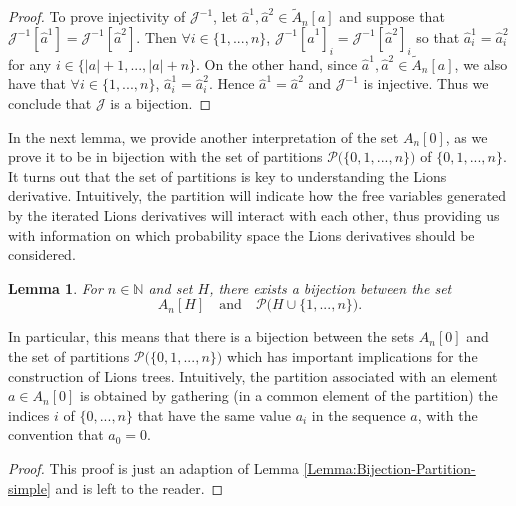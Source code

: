 \documentclass[a4paper,11pt,twoside]{article}
\numberwithin{equation}{section}
\theoremstyle{plain}
\newtheorem{lemma}[theorem]{Lemma}
\newcommand{\bN}{\mathbb{N}}
\newcommand{\cJ}{\mathcal{J}}
\newcommand{\scP}{\mathscr{P}}
\newcommand{\A}[1]{A_{#1}[0]}
\newcommand{\1}{\mathbbm{1}}
\begin{document}
\begin{proof}
		To prove injectivity of $\cJ^{-1}$, let $\hat{a}^1, \hat{a}^2 \in \tilde{A}_n[a]$ and suppose that $\cJ^{-1}[\hat{a}^1] = \cJ^{-1}[\hat{a}^2]$. Then $\forall i \in \{1, ..., n\}$, $\cJ^{-1}[\hat{a}^1]_i = \cJ^{-1}[\hat{a}^2]_i$ so that $\hat{a}_i^1 = \hat{a}_i^2$ for any $i\in \{|a|+1, ..., |a| + n\}$. On the other hand, since $\hat{a}^1, \hat{a}^2\in \tilde{A}_n[a]$, we also have that $\forall i\in \{1, ..., n\}$, $\hat{a}_i^1 = \hat{a}_i^2$. Hence $\hat{a}^1 = \hat{a}^2$ and $\cJ^{-1}$ is injective. Thus we conclude that $\cJ$ is a bijection. 
	\end{proof}
	
	In the next lemma, we provide another interpretation of the set $\A{n}$, as we prove it to be in bijection with the set of partitions $\scP \big( \{0,1, ..., n\}\big)$ of $\{0,1, ..., n\}$. It turns out that the set of partitions is key to understanding the Lions derivative. Intuitively, the partition will indicate how the free variables generated by the iterated Lions derivatives will interact with each other, thus providing us with information on which probability space the Lions derivatives should be considered. 
	
	\begin{lemma}
		\label{Lemma:Bijection-Partition}
		For $n\in \bN$ and set $H$, there exists a bijection between the set 
		$$
		A_n[H] \quad\mbox{and}\quad \scP\big( H \cup \{1, ..., n\}\big).
		$$ 
	\end{lemma}
	
	In particular, this means that there is a bijection between the sets $A_n[0]$ and the set of partitions $\scP\big( \{0, 1, ..., n\}\big)$ which has important implications for the construction of Lions trees. Intuitively, the partition associated with an element $a \in A_{n}[0]$ is obtained by gathering (in a common element of the partition) the indices $i$ of $\{0, ..., n\}$ that have the same value $a_{i}$ in the sequence $a$, with the convention that $a_{0}=0$. 
	
	\begin{proof}
		This proof is just an adaption of Lemma \ref{Lemma:Bijection-Partition-simple} and is left to the reader. 
	\end{proof}
	
	
\end{document}

